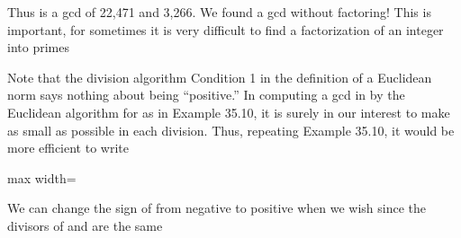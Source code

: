 \documentclass[11pt,oneside]{article}
\begin{document}
\BookNarrativetrue

\begin{BookBody}

\noindent Thus  is a gcd of 22,471 and 3,266. We found a gcd without factoring! This is important, for sometimes it is very difficult to find a factorization of an integer into primes\BookEnd{\blacktriangle}

 Note that the division algorithm Condition 1 in the definition of a Euclidean norm says nothing about  being “positive.” In computing a gcd in  by the Euclidean algorithm for \BookInline{||,\allowbreak } as in Example 35.10, it is surely in our interest to make  as small as possible in each division. Thus, repeating Example 35.10, it would be more efficient to write

\begin{center}\begin{adjustbox}{max width=\linewidth}\end{adjustbox}\end{center}

\noindent We can change the sign of  from negative to positive when we wish since the divisors of  and  are the same\BookEnd{\blacktriangle}

\end{BookBody}

\BookNarrativefalse
\end{document}
